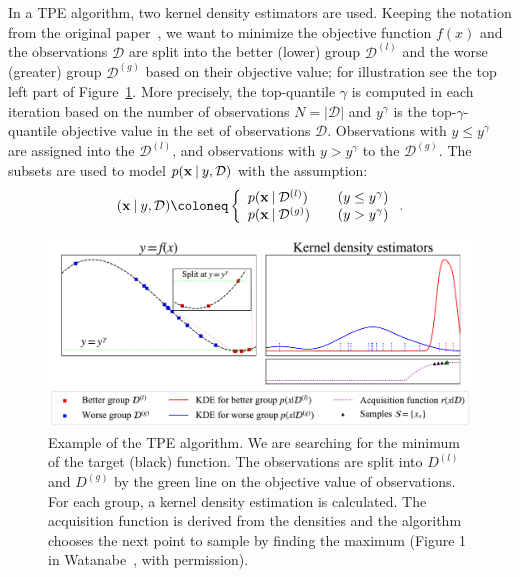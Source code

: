 In a TPE algorithm, two kernel density estimators are used. Keeping the notation from the original paper~\cite{bergstra2011algorithms}, we want to minimize the objective function $f(x)$ and the observations $\mathcal{D}$ are split into the better (lower) group $\mathcal{D}^{(l)}$ and the worse (greater) group $\mathcal{D}^{(g)}$ based on their objective value; for illustration see the top left part of Figure~\ref{fig:tpe}. More precisely, the top-quantile $\gamma$ is computed in each iteration based on the number of observations $N=|\mathcal{D}|$ and $y^{\gamma}$ is the top-$\gamma$-quantile objective value in the set of observations $\mathcal{D}$. Observations with $y\leq y^\gamma$ are assigned into the $\mathcal{D}^{(l)}$, and observations with $y > y^\gamma$ to the $\mathcal{D}^{(g)}$. The subsets are used to model $p(\mathbf{x} \:\vert\: y, \mathcal{D})$ with the assumption:
\begin{equation} (\mathbf{x} \given y, \mathcal{D})\coloneq  \left\{
  \begin{array}{ll}
        p(\mathbf{x} \given \mathcal{D}^{(l)}) \quad  &(y \leq y^\gamma) \\
        p(\mathbf{x} \given \mathcal{D}^{(g)}) \quad  &(y > y^\gamma)
  \end{array}
  \right. .
  \label{eqn:tpe:assumption}
\end{equation}

\begin{figure}
    \centering
    \includegraphics[scale=0.40]{img/tpe-conceptual.pdf}
    \caption{Example of the TPE algorithm. We are searching for the minimum of the target (black) function. The observations are split into $D^{(l)}$ and $D^{(g)}$ by the green line on the objective value of observations. For each group, a kernel density estimation is calculated. The acquisition function is derived from the densities and the algorithm chooses the next point to sample by finding the maximum (Figure 1 in Watanabe~\cite{watanabe2023tree}, with permission).}
    \label{fig:tpe}
\end{figure}

